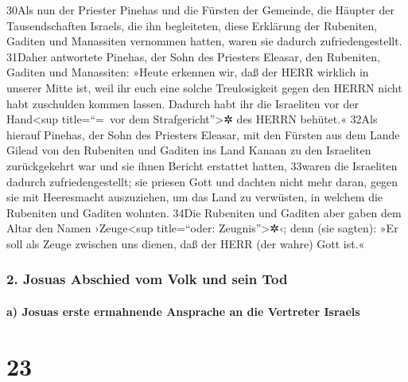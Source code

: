 30Als nun der Priester Pinehas und die Fürsten der Gemeinde, die Häupter
der Tausendschaften Israels, die ihn begleiteten, diese Erklärung der
Rubeniten, Gaditen und Manassiten vernommen hatten, waren sie dadurch
zufriedengestellt. 31Daher antwortete Pinehas, der Sohn des Priesters
Eleasar, den Rubeniten, Gaditen und Manassiten: »Heute erkennen wir, daß
der HERR wirklich in unserer Mitte ist, weil ihr euch eine solche
Treulosigkeit gegen den HERRN nicht habt zuschulden kommen lassen.
Dadurch habt ihr die Israeliten vor der Hand\textless sup title=``=~vor
dem Strafgericht''\textgreater✲ des HERRN behütet.« 32Als hierauf
Pinehas, der Sohn des Priesters Eleasar, mit den Fürsten aus dem Lande
Gilead von den Rubeniten und Gaditen ins Land Kanaan zu den Israeliten
zurückgekehrt war und sie ihnen Bericht erstattet hatten, 33waren die
Israeliten dadurch zufriedengestellt; sie priesen Gott und dachten nicht
mehr daran, gegen sie mit Heeresmacht auszuziehen, um das Land zu
verwüsten, in welchem die Rubeniten und Gaditen wohnten. 34Die Rubeniten
und Gaditen aber gaben dem Altar den Namen ›Zeuge\textless sup
title=``oder: Zeugnis''\textgreater✲‹; denn (sie sagten): »Er soll als
Zeuge zwischen uns dienen, daß der HERR (der wahre) Gott ist.«

\hypertarget{josuas-abschied-vom-volk-und-sein-tod}{%
\subsubsection{2. Josuas Abschied vom Volk und sein
Tod}\label{josuas-abschied-vom-volk-und-sein-tod}}

\hypertarget{a-josuas-erste-ermahnende-ansprache-an-die-vertreter-israels}{%
\paragraph{a) Josuas erste ermahnende Ansprache an die Vertreter
Israels}\label{a-josuas-erste-ermahnende-ansprache-an-die-vertreter-israels}}

\hypertarget{section-22}{%
\section{23}\label{section-22}}

